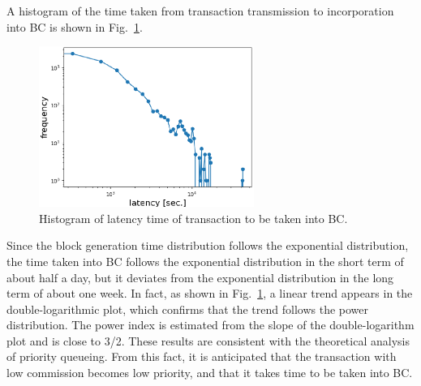 \documentclass[graybox]{svmult}
\begin{document}
A histogram of the time taken from transaction transmission to incorporation into BC is shown in Fig.~\ref{fig:exp3-2}.
%
\begin{figure}[t]
  \begin{center}
    \includegraphics[width=70mm]{exp3-2.eps}
  \end{center}
  \caption{Histogram of latency time of transaction to be taken into BC.}
  \label{fig:exp3-2}
\end{figure}
%
Since the block generation time distribution follows the exponential distribution, the time taken into BC follows the exponential distribution in the short term of about half a day, but it deviates from the exponential distribution in the long term of about one week.
In fact, as shown in Fig.~\ref{fig:exp3-2}, a linear trend appears in the double-logarithmic plot, which confirms that the trend follows the power distribution.
The power index is estimated from the slope of the double-logarithm plot and is close to 3/2.
These results are consistent with the theoretical analysis of priority queueing.
From this fact, it is anticipated that the transaction with low commission becomes low priority, and that it takes time to be taken into BC.
\end{document}
